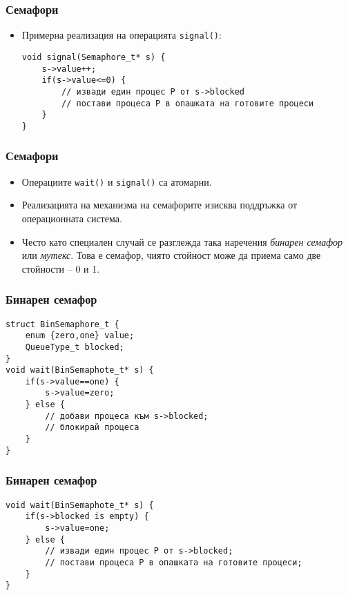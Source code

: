 \documentclass[ignorenonframetext, hyperref=unicode]{beamer}
\begin{document}
\begin{frame}[containsverbatim]
\frametitle{Семафори}
\begin{itemize}
\item Примерна реализация на операцията \lstinline{signal()}:
\begin{lstlisting}
void signal(Semaphore_t* s) {
	s->value++;
	if(s->value<=0) {
		// извади един процес P от s->blocked
		// постави процеса P в опашката на готовите процеси
	}
}
\end{lstlisting}
\end{itemize}
\end{frame}

\begin{frame}[containsverbatim]
\frametitle{Семафори}
\begin{itemize}
\item Операциите \lstinline{wait()} и \lstinline{signal()} са атомарни.
\item Реализацията на механизма на семафорите изисква поддръжка от операционната
система.
\item Често като специален случай се разглежда така наречения 
{\em бинарен семафор} или {\em мутекс}. Това е семафор, чиято стойност може да
приема само две стойности -- 0 и 1.
\end{itemize}
\end{frame}


\begin{frame}[containsverbatim]
\frametitle{Бинарен семафор}
\begin{lstlisting}
struct BinSemaphore_t {
	enum {zero,one} value;
	QueueType_t blocked;
} 
void wait(BinSemaphote_t* s) {
	if(s->value==one) {
		s->value=zero;
	} else {
		// добави процеса към s->blocked;
		// блокирай процеса
	}
}
\end{lstlisting}
\end{frame}

\begin{frame}[containsverbatim]
\frametitle{Бинарен семафор}
\begin{lstlisting}
void wait(BinSemaphote_t* s) {
	if(s->blocked is empty) {
		s->value=one;
	} else {
		// извади един процес P от s->blocked;
		// постави процеса P в опашката на готовите процеси;
	}
}
\end{lstlisting}
\end{frame}
\end{document}
